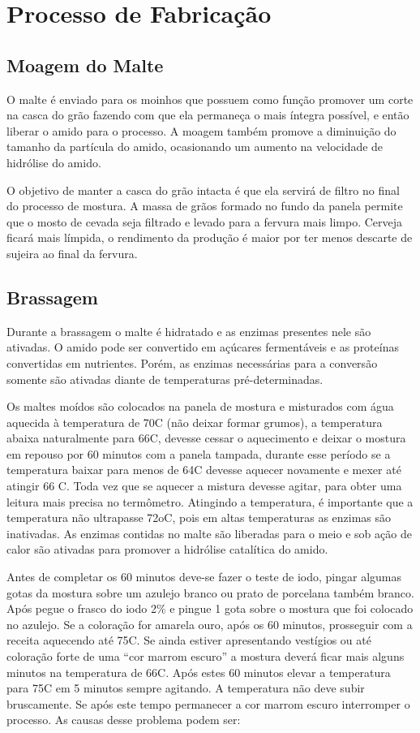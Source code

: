 \clearpage
\section{Processo de Fabricação}

\subsection{Moagem do Malte}

O malte é enviado para os moinhos que possuem como função promover um corte na casca do grão fazendo com que ela permaneça o mais íntegra possível, e então liberar o amido para o processo. A moagem também promove a diminuição do tamanho da partícula do amido, ocasionando um aumento na velocidade de hidrólise do amido.

O objetivo de manter a casca do grão intacta é que ela servirá de filtro no final do processo de mostura. A massa de grãos formado no fundo da panela permite que o mosto de cevada seja filtrado e levado para a fervura mais limpo. Cerveja ficará mais límpida, o rendimento da produção é maior por ter menos descarte de sujeira ao final da fervura.

\subsection{Brassagem}
Durante a brassagem o malte é hidratado e as enzimas presentes nele são ativadas. O amido pode ser convertido em açúcares fermentáveis e as proteínas convertidas em nutrientes. Porém, as enzimas necessárias para a conversão somente são ativadas diante de temperaturas pré-determinadas.

Os maltes moídos são colocados na panela de mostura e misturados com água aquecida à temperatura de 70\textdegree C (não deixar formar grumos), a temperatura abaixa naturalmente para 66\textdegree C, devesse cessar o aquecimento e deixar o mostura em repouso por 60 minutos com a panela tampada, durante esse período se a temperatura baixar para menos de 64\textdegree C devesse aquecer novamente e mexer até atingir 66 \textdegree C. Toda vez que se aquecer a mistura devesse agitar, para obter uma leitura mais precisa no termômetro. Atingindo a temperatura, é importante que a temperatura não ultrapasse 72oC, pois em altas temperaturas as enzimas são inativadas. As enzimas contidas no malte são liberadas para o meio e sob ação de calor são ativadas para promover a hidrólise catalítica do amido.

Antes de completar os 60 minutos deve-se fazer o teste de iodo, pingar algumas gotas da mostura sobre um azulejo branco ou prato de porcelana também branco. Após pegue o frasco do iodo 2\% e pingue 1 gota sobre o mostura que foi colocado no azulejo. Se a coloração for amarela ouro, após os 60 minutos, prosseguir com a receita aquecendo até 75\textdegree C. Se ainda estiver apresentando vestígios ou até coloração forte de uma “cor marrom escuro” a mostura deverá ficar mais alguns minutos na temperatura de 66\textdegree C.
Após estes 60 minutos elevar a temperatura para 75\textdegree C em 5 minutos sempre agitando. A temperatura não deve subir bruscamente. Se após este tempo permanecer a cor marrom escuro interromper o processo. As causas desse problema podem ser:

